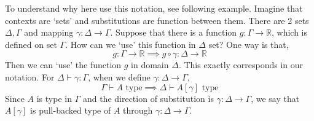 \documentclass[12pt, letterpaper]{amsart}
\theoremstyle{definition}
\theoremstyle{remark}
\theoremstyle{plain}
\numberwithin{equation}{section}
\begin{document}
\begin{tcolorbox}[colback=yellow!10!white,colframe=red!75!black,title=1.3.  Intuitions for direction of substitutions]\label{intuition}
    To understand why here use this notation, see following example. Imagine that contexts are \lq sets' 
    and substitutions are function between them. There are 2 sets $\Delta, \Gamma$ and mapping $\gamma : \Delta \rightarrow \Gamma$. 
    Suppose that there is a function $g : \Gamma \rightarrow \mathbb{R}$, which is defined on set $\Gamma$. How can we 
    \lq use' this function in $\Delta$ set? One way is that, 
    \[g : \Gamma \rightarrow \mathbb{R} \implies g \circ \gamma : \Delta \rightarrow \mathbb{R}\]
    Then we can \lq use' the function $g$ in domain $\Delta$. This exactly corresponds in our notation. 
    For $\Delta \vdash \gamma : \Gamma$, when we define $\gamma : \Delta \rightarrow \Gamma$, 
    \[\Gamma \vdash A \text{ type} \implies \Delta \vdash A[\gamma] \text{ type}\]
    Since $A$ is type in $\Gamma$ and the direction of substitution is $\gamma : \Delta \rightarrow \Gamma$, we say that 
    $A[\gamma]$ is pull-backed type of $A$ through $\gamma : \Delta \rightarrow \Gamma$. 
\end{tcolorbox}
\end{document}
